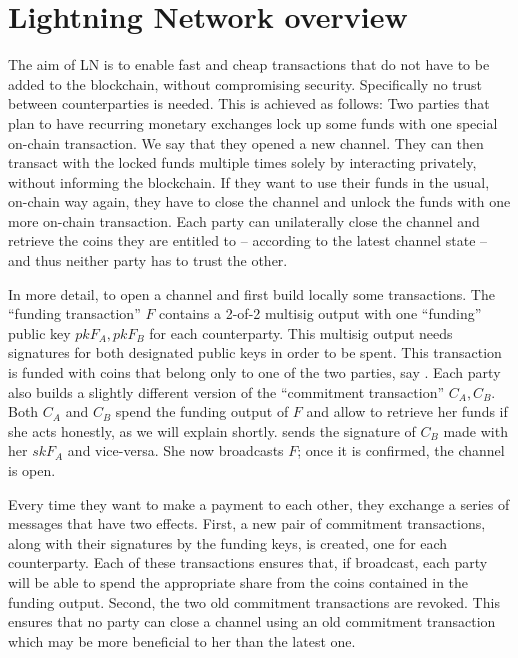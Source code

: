 \section{Lightning Network overview}
\label{sec:ov-ln}

    The aim of LN is to enable fast and cheap transactions that do not have to
    be added to the blockchain, without compromising security. Specifically no
    trust between counterparties is needed. This is achieved as follows: Two
    parties that plan to have recurring monetary exchanges lock up some funds
    with one special on-chain transaction. We say that they opened a new
    channel. They can then transact with the locked funds multiple times solely
    by interacting privately, without informing the blockchain. If they want to
    use their funds in the usual, on-chain way again, they have to close the
    channel and unlock the funds with one more on-chain transaction. Each party
    can unilaterally close the channel and retrieve the coins they are entitled
    to -- according to the latest channel state -- and thus neither party has to
    trust the other.

    In more detail, to open a channel \alice{} and \bob{} first build locally
    some transactions. The ``funding transaction'' $F$ contains a 2-of-2
    multisig output with one ``funding'' public key $pkF_A, pkF_B$ for each
    counterparty. This multisig output needs signatures for both designated
    public keys in order to be spent. This transaction is funded with coins that
    belong only to one of the two parties, say \alice. Each party also builds a
    slightly different version of the ``commitment transaction'' $C_A, C_B$.
    Both $C_A$ and $C_B$ spend the funding output of $F$ and allow \alice{} to
    retrieve her funds if she acts honestly, as we will explain shortly.
    \alice{} sends \bob{} the signature of $C_B$ made with her $skF_A$ and
    vice-versa. She now broadcasts $F$; once it is confirmed, the channel is
    open.

    Every time they want to make a payment to each other, they exchange a series
    of messages that have two effects. First, a new pair of commitment
    transactions, along with their signatures by the funding keys, is created,
    one for each counterparty. Each of these transactions ensures that, if
    broadcast, each party will be able to spend the appropriate share from the
    coins contained in the funding output. Second, the two old commitment
    transactions are revoked. This ensures that no party can close a channel
    using an old commitment transaction which may be more beneficial to her than
    the latest one.

